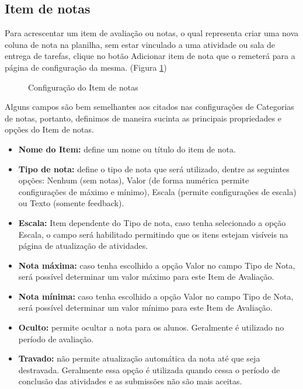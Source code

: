 \subsection{Item de notas}
Para acrescentar um item de avaliação ou notas, o qual representa criar uma nova coluna de nota na planilha, sem estar vinculado a uma atividade ou sala de entrega de tarefas, clique no botão Adicionar item de nota que o remeterá para a página de configuração da mesma. (Figura \ref{fig:cap6_20})

\begin{figure}[htbp]
 \begin{center}
  \caption{Configuração do Item de notas}
  \label{fig:cap6_20}
 \end{center}
\end{figure}
Alguns campos são bem semelhantes aos citados nas configurações de Categorias de notas, portanto, definimos de maneira sucinta as principais propriedades e opções do Item de notas.

\begin{itemize}
 \item \textbf{Nome do Item:} define um nome ou título do item de nota.
 \item \textbf{Tipo de nota:} define o tipo de nota que será utilizado, dentre as seguintes opções: Nenhum (sem notas), Valor (de forma numérica permite configurações de máximo e mínimo), Escala (permite configurações de escala) ou Texto (somente feedback).
 \item \textbf{Escala:} Item dependente do Tipo de nota, caso tenha selecionado a opção Escala, o campo será habilitado permitindo que os itens estejam visíveis na página de atualização de atividades.
 \item \textbf{Nota máxima:} caso tenha escolhido a opção Valor no campo Tipo de Nota, será possível determinar um valor máximo para este Item de Avaliação.
 \item \textbf{Nota mínima:} caso tenha escolhido a opção Valor no campo Tipo de Nota, será possível determinar um valor mínimo para este Item de Avaliação.
 \item \textbf{Oculto:} permite ocultar a nota para os alunos. Geralmente é utilizado no período de avaliação.
 \item \textbf{Travado:} não permite atualização automática da nota até que seja destravada. Geralmente essa opção é utilizada quando cessa o período de conclusão das atividades e as submissões não são mais aceitas.
 \end{itemize}

